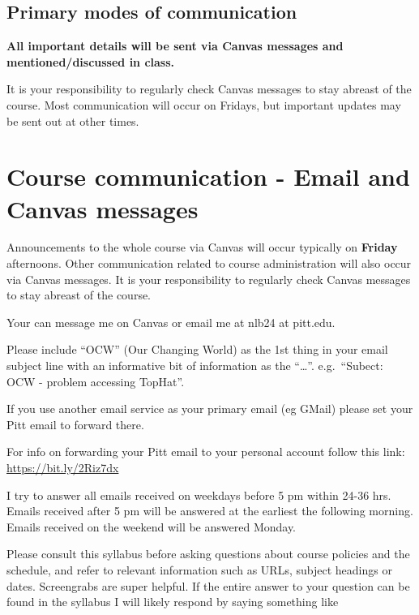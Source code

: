 \documentclass[
]{book}
\begin{document}
\hypertarget{primary-modes-of-communication}{%
\section{Primary modes of communication}\label{primary-modes-of-communication}}

\textbf{All important details will be sent via Canvas messages and mentioned/discussed in class.}

It is your responsibility to regularly check Canvas messages to stay abreast of the course. Most communication will occur on Fridays, but important updates may be sent out at other times.

\hypertarget{email_and_canvas_msg}{%
\chapter{Course communication - Email and Canvas messages}\label{email_and_canvas_msg}}

Announcements to the whole course via Canvas will occur typically on \textbf{Friday} afternoons. Other communication related to course administration will also occur via Canvas messages. It is your responsibility to regularly check Canvas messages to stay abreast of the course.

Your can message me on Canvas or email me at nlb24 at pitt.edu.

Please include ``OCW'' (Our Changing World) as the 1st thing in your email subject line with an informative bit of information as the ``\ldots{}''. e.g.~``Subect: OCW - problem accessing TopHat''.

If you use another email service as your primary email (eg GMail) please set your Pitt email to forward there.

For info on forwarding your Pitt email to your personal account follow this link: \url{https://bit.ly/2Riz7dx}

I try to answer all emails received on weekdays before 5 pm within 24-36 hrs. Emails received after 5 pm will be answered at the earliest the following morning. Emails received on the weekend will be answered Monday.

Please consult this syllabus before asking questions about course policies and the schedule, and refer to relevant information such as URLs, subject headings or dates. Screengrabs are super helpful. If the entire answer to your question can be found in the syllabus I will likely respond by saying something like
\end{document}
